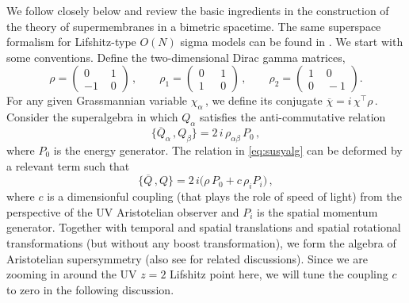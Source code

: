 \documentclass[11pt]{article}
\newcommand{\be}{\begin{equation}}
\newcommand{\ee}{\end{equation}}
\begin{document}
We follow closely \cite{as} below and review the basic ingredients in the construction of the theory of supermembranes in a bimetric spacetime. The same superspace formalism for Lifshitz-type $O(N)$ sigma models can be found in \cite{Gomes:2016tus}. We start with some conventions. Define the two-dimensional Dirac gamma matrices,
%
\be
	\rho = 
		\begin{pmatrix}
			0 & \,\, 1 \\
			-1 & \,\, 0
		\end{pmatrix}\,,
	\qquad
	\rho^{}_1 = 
		\begin{pmatrix}
			0 & \,\,\,\, 1 \\
			1 & \,\,\,\, 0
		\end{pmatrix}\,,
	\qquad
	\rho^{}_2 = 
		\begin{pmatrix}
			1 & \,\, 0 \\
			0 & \,\, -1
		\end{pmatrix}.
\ee
%
For any given Grassmannian variable $\chi_\alpha$\,, we define its conjugate $\overline{\chi} = i \, \chi^\intercal \rho$\,.
Consider the superalgebra in which $Q_\alpha$ satisfies the anti-commutative relation
%
\be \label{eq:susyalg}
	\{ \overline{Q}^{}_\alpha\,, Q^{}_\beta \} = 2 \, i \, \rho^{}_{\alpha\beta} \, P_0\,, 
\ee
%
where $P_0$ is the energy generator. The relation in \eqref{eq:susyalg} can be deformed by a relevant term such that 
%
\be \label{eq:QQc}
	\{ \overline{Q}\,, Q \} = 2 \, i \bigl( \rho \, P_0 + c \, \rho^{}_i P_i \bigr)\,,
\ee
%
where $c$ is a dimensionful coupling (that plays the role of speed of light) from the perspective of the UV Aristotelian observer and $P_i$ is the spatial momentum generator. Together with temporal and spatial translations and spatial rotational transformations (but without any boost transformation), we form the algebra of Aristotelian supersymmetry \cite{ssl, as} (also see \cite{Frenkel:2020djn} for related discussions). Since we are zooming in around the UV $z=2$ Lifshitz point here, we will tune the coupling $c$ to zero in the following discussion.
\end{document}
